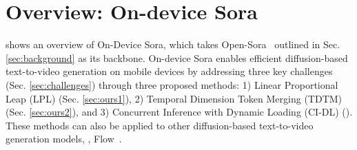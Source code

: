 
\section{Overview: On-device Sora}

 shows an overview of On-Device Sora, which takes Open-Sora~\cite{opensora} outlined in Sec. \ref{sec:background} as its backbone. On-device Sora enables efficient diffusion-based text-to-video generation on mobile devices by addressing three key challenges (Sec. \ref{sec:challenges}) through three proposed methods: 1) Linear Proportional Leap (LPL) (Sec. \ref{sec:ours1}), 2) Temporal Dimension Token Merging (TDTM) (Sec. \ref{sec:ours2}), and 3) Concurrent Inference with Dynamic Loading (CI-DL) (). These methods can also be applied to other diffusion-based text-to-video generation models, \eg,  Flow~\cite{jin2024pyramidal}.






